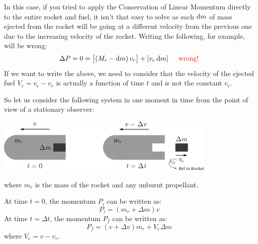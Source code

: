 \documentclass[answers]{exam}
\begin{document}
\begin{questions}
{\begin{solution}
			In this case, if you tried to apply the Conservation of Linear Momentum directly to the entire rocket and fuel, it isn't that easy to solve as each $\dif{m}$ of mass ejected from the rocket will be going at a different velocity from the previous one due to the increasing velocity of the rocket. Writing the following, for example, will be wrong:
			\begin{equation}
				\Delta P = 0 = \left[\left(M_r - \dif{m}\right)v_r\right] + \left[v_e\dif{m}\right] ~~~~ \text{\textcolor{red}{wrong!}}
			\end{equation}
			If we want to write the above, we need to consider that the velocity of the ejected fuel $V_e = v_e - v_r$ is actually a function of time $t$ and is not the constant $v_e$. 

			So let us consider the following system in one moment in time from the point of view of a stationary observer:
			\begin{center}
				\includegraphics[width=0.8\textwidth]{rocket_system.eps}
			\end{center}
			where $m_r$ is the mass of the rocket and any unburnt propellant.

			At time $t = 0$, the momentum $P_i$ can be written as:
			\begin{equation}
				P_i = \left(m_r + \Delta m\right)v
			\end{equation}
			At time $t = \Delta t$, the momentum $P_{f}$ can be written as:
			\begin{equation}
				P_{f} = \left(v + \Delta v\right)m_r + V_e \Delta m
			\end{equation}
			where $V_e = v - v_e$.


\end{solution}}
\end{questions}
\end{document}
